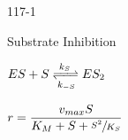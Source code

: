\begin{mitframe}{117-1}
\begin{listone}
    \item Substrate Inhibition
    
    \begin{listtwo}
	    \item $\energy\entropy+\entropy\xrightleftharpoons[\thermcond_{-\entropy}]{\thermcond_{\entropy}}\energy\entropy_2$
    	\item $\pos=\dfrac{\vvel_{max}\entropy}{\dilfac_M+\entropy+\sfrac{\entropy^2}{\dilfac_{\entropy}}}$       
     \end{listtwo}
\end{listone}     
\end{mitframe}